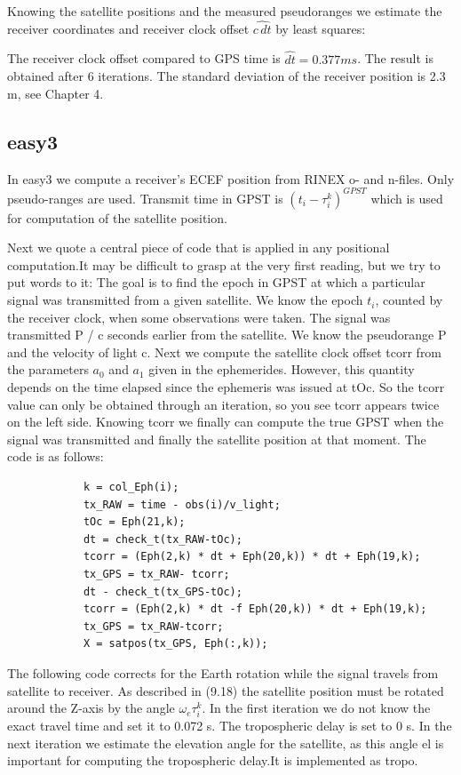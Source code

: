 	Knowing the satellite positions and the measured pseudoranges we estimate the receiver coordinates and receiver clock offset $\hat{c\,dt}$ by least squares:
		
	The receiver clock offset compared to GPS time is $\hat{dt} = 0.377 ms$. The result is obtained after 6 iterations. The standard deviation of the receiver position is 2.3 m, see Chapter 4.
	\subsection{easy3}\label{subsec:easy3}
		In easy3 we compute a receiver’s ECEF position from RINEX o- and n-files. Only pseudo-ranges are used. Transmit time in GPST is $(t_i-\tau^k_i)^{GPST}$ which is used for computation of the satellite position.
		
		Next we quote a central piece of code that is applied in any positional computation.It may be difficult to grasp at the very first reading, but we try to put words to it: The goal is to find the epoch in GPST at which a particular signal was transmitted from a given satellite. We know the epoch $t_i$, counted by the receiver clock, when some observations were taken. The signal was transmitted P / c seconds earlier from the satellite. We know the pseudorange P and the velocity of light c. Next we compute the satellite clock offset tcorr from the parameters $a_0$ and $a_1$ given in the ephemerides. However, this quantity depends on the time elapsed since the ephemeris was issued at tOc. So the tcorr value can only be obtained through an iteration, so you see tcorr appears twice on the left side. Knowing tcorr we finally can compute the true GPST when the signal was transmitted and finally the satellite position at that moment. The code is as follows:
		\begin{lstlisting}
			k = col_Eph(i);
			tx_RAW = time - obs(i)/v_light;
			tOc = Eph(21,k);
			dt = check_t(tx_RAW-tOc);
			tcorr = (Eph(2,k) * dt + Eph(20,k)) * dt + Eph(19,k);
			tx_GPS = tx_RAW- tcorr;
			dt - check_t(tx_GPS-tOc);
			tcorr = (Eph(2,k) * dt -f Eph(20,k)) * dt + Eph(19,k);
			tx_GPS = tx_RAW-tcorr;
			X = satpos(tx_GPS, Eph(:,k));			
		\end{lstlisting}
		The following code corrects for the Earth rotation while the signal travels from satellite to receiver. As described in (9.18) the satellite position must be rotated around the Z-axis by the angle $\omega_e\tau^k_i$. In the first iteration we do not know the exact travel time and set it to 0.072 s. The tropospheric delay is set to 0 s. In the next iteration we estimate the elevation angle for the satellite, as this angle el is important for computing the tropospheric delay.It is implemented as tropo.
